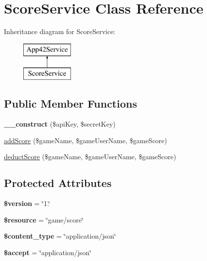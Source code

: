 \hypertarget{class_score_service}{\section{Score\+Service Class Reference}
\label{class_score_service}
}
Inheritance diagram for Score\+Service\+:\begin{figure}[H]
\begin{center}
\leavevmode
\includegraphics[height=2.000000cm]{class_score_service}
\end{center}
\end{figure}
\subsection*{Public Member Functions}
\begin{DoxyCompactItemize}
\item 
\hypertarget{class_score_service_a49f2ad222e06420736d750e167d55d7c}{{\bfseries \+\_\+\+\_\+construct} (\$api\+Key, \$secret\+Key)}\label{class_score_service_a49f2ad222e06420736d750e167d55d7c}

\item 
\hyperlink{class_score_service_a1967742ab084fd9c30cd13335399ac26}{add\+Score} (\$game\+Name, \$game\+User\+Name, \$game\+Score)
\item 
\hyperlink{class_score_service_a2899145623ded43fd85cbfd734e53f6d}{deduct\+Score} (\$game\+Name, \$game\+User\+Name, \$game\+Score)
\end{DoxyCompactItemize}
\subsection*{Protected Attributes}
\begin{DoxyCompactItemize}
\item 
\hypertarget{class_score_service_a17c8948c68aa44fa9961ae169b6a8961}{{\bfseries \$version} = \char`\"{}1.\char`\"{}}\label{class_score_service_a17c8948c68aa44fa9961ae169b6a8961}

\item 
\hypertarget{class_score_service_abd4c7b8b084214b8d2533ba07fce6b83}{{\bfseries \$resource} = \char`\"{}game/score\char`\"{}}\label{class_score_service_abd4c7b8b084214b8d2533ba07fce6b83}

\item 
\hypertarget{class_score_service_ae754d6373f275e781f47c8bc9b994b6d}{{\bfseries \$content\+\_\+type} = \char`\"{}application/json\char`\"{}}\label{class_score_service_ae754d6373f275e781f47c8bc9b994b6d}

\item 
\hypertarget{class_score_service_a75fc18c4ff06288ff9fdf8aba9bd1081}{{\bfseries \$accept} = \char`\"{}application/json\char`\"{}}\label{class_score_service_a75fc18c4ff06288ff9fdf8aba9bd1081}

\end{DoxyCompactItemize}
